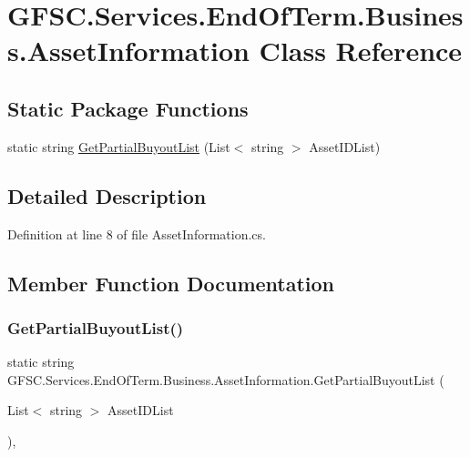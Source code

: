 \hypertarget{class_g_f_s_c_1_1_services_1_1_end_of_term_1_1_business_1_1_asset_information}{}\section{G\+F\+S\+C.\+Services.\+End\+Of\+Term.\+Business.\+Asset\+Information Class Reference}
\label{class_g_f_s_c_1_1_services_1_1_end_of_term_1_1_business_1_1_asset_information}
\subsection*{Static Package Functions}
\begin{DoxyCompactItemize}
\item 
static string \mbox{\hyperlink{class_g_f_s_c_1_1_services_1_1_end_of_term_1_1_business_1_1_asset_information_a1ed3d1a7a6271e6b68dc731e4822fc25}{Get\+Partial\+Buyout\+List}} (List$<$ string $>$ Asset\+I\+D\+List)
\end{DoxyCompactItemize}


\subsection{Detailed Description}


Definition at line 8 of file Asset\+Information.\+cs.



\subsection{Member Function Documentation}
\mbox{\label{class_g_f_s_c_1_1_services_1_1_end_of_term_1_1_business_1_1_asset_information_a1ed3d1a7a6271e6b68dc731e4822fc25}} 
\subsubsection{\texorpdfstring{Get\+Partial\+Buyout\+List()}{GetPartialBuyoutList()}}
{\footnotesize\ttfamily static string G\+F\+S\+C.\+Services.\+End\+Of\+Term.\+Business.\+Asset\+Information.\+Get\+Partial\+Buyout\+List (\begin{DoxyParamCaption}\item[{List$<$ string $>$}]{Asset\+I\+D\+List }\end{DoxyParamCaption})\hspace{0.3cm}{\ttfamily [static]}, {\ttfamily [package]}}



